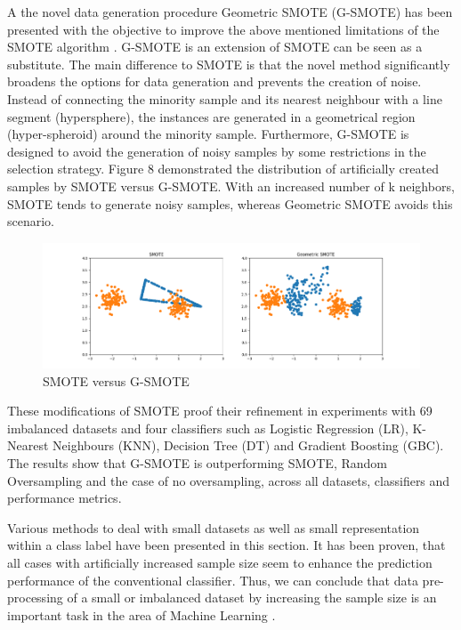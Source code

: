 \documentclass[parskip=full]{scrartcl}
\begin{document}
A the novel data generation procedure Geometric SMOTE (G-SMOTE) has been presented with the objective to improve the above mentioned limitations of the SMOTE algorithm \cite{Douzas.2019b}. G-SMOTE is an extension of SMOTE can be seen as a substitute. The main difference to SMOTE is that the novel method significantly broadens the options for data generation and prevents the creation of noise. Instead of connecting the minority sample and its nearest neighbour with a line segment (hypersphere), the instances are generated in a geometrical region (hyper-spheroid) around the minority sample. Furthermore, G-SMOTE is designed to avoid the generation of noisy samples by some restrictions in the selection strategy. Figure 8 demonstrated the distribution of artificially created samples by SMOTE versus G-SMOTE. With an increased number of k neighbors, SMOTE tends to generate noisy samples, whereas Geometric SMOTE avoids this scenario.

\begin{figure}[H]
	\centering
	\includegraphics[width=0.8\linewidth]{resources/smote_vs_gsmote}
	\caption{SMOTE versus G-SMOTE \cite{Douzas.2019}}
	\label{fig:smotevsgsmote}
\end{figure}

These modifications of SMOTE proof their refinement in experiments with 69 imbalanced datasets and four classifiers such as Logistic Regression (LR), K-Nearest Neighbours (KNN), Decision Tree (DT) and Gradient Boosting (GBC). The results show that G-SMOTE is outperforming SMOTE, Random Oversampling and the case of no oversampling, across all datasets, classifiers and performance metrics.    

Various methods to deal with small datasets as well as small representation within a class label have been presented in this section. It has been proven, that all cases with artificially increased sample size seem to enhance the prediction performance of the conventional classifier. Thus, we can conclude that data pre-processing of a small or imbalanced dataset by increasing the sample size is an important task in the area of Machine Learning \cite{Ruparel.2013}.
\end{document}
